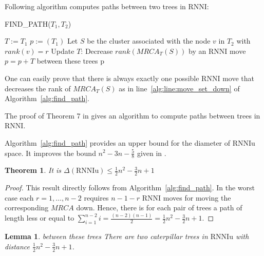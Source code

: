 \documentclass[11pt, a4paper]{article}
\newcommand{\rnni}{\mathrm{RNNI}}
\newcommand{\rnniu}{\mathrm{RNNIu}}
\newtheorem{theorem}[definition]{Theorem}
\newtheorem{lemma}[definition]{Lemma}
\begin{document}
Following algorithm computes paths between two trees in $\rnni$:

\begin{algorithm}[H]
\caption{FIND\_PATH($T_1,T_2$)}
\label{alg:find_path}
\begin{algorithmic}[1]
	\STATE $T := T_1$
	\STATE $p := (T_1)$
		\STATE Let $S$ be the cluster associated with the node $v$ in $T_2$ with $rank(v) = r$
			\STATE Update $T$: Decrease $rank(MRCA_T(S))$ by an $\rnni$ move \label{alg:line:move_set_down}
			\STATE $p = p+T$
		\ENDWHILE between these trees
	\ENDFOR
	\RETURN p
\end{algorithmic}
\end{algorithm}

One can easily prove that there is always exactly one possible $\rnni$ move that decreases the rank of $MRCA_T(S)$ as in line~\ref{alg:line:move_set_down} of Algorithm~\ref{alg:find_path}.

The proof of Theorem 7 in \cite{Gavryushkin2017} gives an algorithm to compute paths between trees in $\rnni$.



Algorithm~\ref{alg:find_path} provides an upper bound for the diameter of $\rnniu$ space.
It improves the bound $n^2 - 3n - \frac{5}{8}$ given in \cite{Gavryushkin2017}.

\begin{theorem}
	It is $\Delta(\rnniu) \leq \frac{1}{2}n^2-\frac{3}{2}n+1$
\end{theorem}

\begin{proof}
	This result directly follows from Algorithm~\ref{alg:find_path}.
	In the worst case each $r = 1, \dots, n-2$ requires $n-1-r$ $\rnni$ moves for moving the corresponding $MRCA$ down.
	Hence, there is for each pair of trees a path of length less or equal to $\sum\limits_{i = 1}^{n-2} i = \frac{(n-2)(n-1)}{2} = \frac{1}{2}n^2-\frac{3}{2}n+1$.
\end{proof}

\begin{lemma} between these trees
	There are two caterpillar trees in $\rnniu$ with distance $\frac{1}{2}n^2-\frac{3}{2}n+1$.
	\label{conj:caterpillar_diameter}
\end{lemma}
\end{document}
